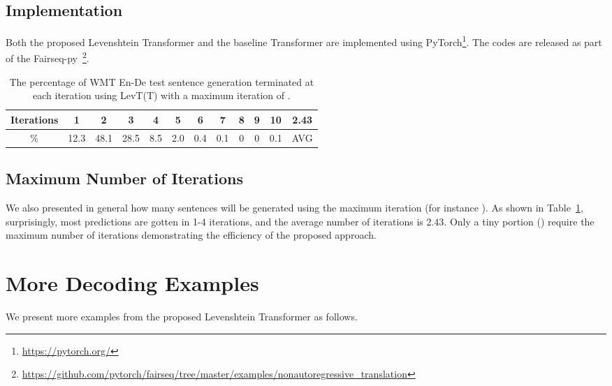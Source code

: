 \documentclass{article}
\begin{document}
\subsection{Implementation}
Both the proposed Levenshtein Transformer and the baseline Transformer are implemented using
PyTorch\footnote{\url{https://pytorch.org/}}. The codes are released as part of the Fairseq-py~\footnote{\url{https://github.com/pytorch/fairseq/tree/master/examples/nonautoregressive_translation}}.

\begin{table}[]
    \centering
    \caption{The percentage of WMT En-De test sentence generation terminated at each iteration using LevT(T) with a maximum iteration of .}
    \begin{tabular}{ccccccccccc|c}
\\\toprule  
Iterations & 1 & 2 &3 &4 &5 &6 &7&8 & 9 &10& 2.43\\\midrule
\% & 12.3 & 48.1 & 28.5 & 8.5 & 2.0 & 0.4 & 0.1 & 0 & 0 & 0.1 & AVG
 \\  \bottomrule
\end{tabular}   
    \label{tab:max_iteration}
\end{table}

\subsection{Maximum Number of Iterations}
We also presented in general how many sentences will be generated using the maximum iteration (for instance ). As shown in Table~\ref{tab:max_iteration}, surprisingly, most predictions are gotten in 1-4 iterations, and the average number of iterations is 2.43. Only a tiny portion () require the maximum number of iterations demonstrating the efficiency of the proposed approach.







\newpage
\section{More Decoding Examples}
We present more examples from the proposed Levenshtein Transformer as follows.
\end{document}
